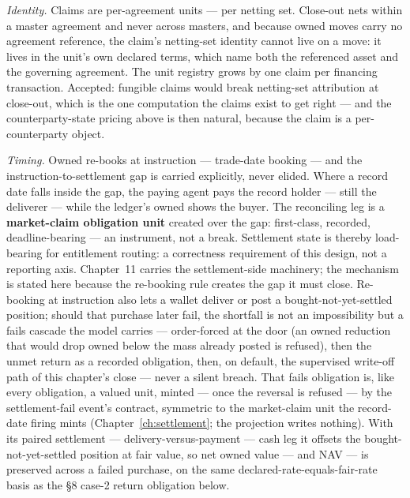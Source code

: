 \emph{Identity.} Claims are per-agreement units --- per netting set. Close-out
nets within a master agreement and never across masters, and because owned
moves carry no agreement reference, the claim's netting-set identity cannot
live on a move: it lives in the unit's own declared terms, which name both the
referenced asset and the governing agreement. The unit registry grows by one
claim per financing transaction. Accepted: fungible claims would break
netting-set attribution at close-out, which is the one computation the claims
exist to get right --- and the counterparty-state pricing above is then
natural, because the claim is a per-counterparty object.

\emph{Timing.} Owned re-books at instruction --- trade-date booking --- and
the instruction-to-settlement gap is carried explicitly, never elided. Where a
record date falls inside the gap, the paying agent pays the record holder ---
still the deliverer --- while the ledger's owned shows the buyer. The
reconciling leg is a \textbf{market-claim obligation unit} created over the
gap: first-class, recorded, deadline-bearing --- an instrument, not a break.
Settlement state is thereby load-bearing for entitlement routing: a
correctness requirement of this design, not a reporting axis. Chapter~11
carries the settlement-side machinery; the mechanism is stated here because
the re-booking rule creates the gap it must close. Re-booking at instruction
also lets a wallet deliver or post a bought-not-yet-settled position; should
that purchase later fail, the shortfall is not an impossibility but a fails
cascade the model carries --- order-forced at the door (an owned reduction that
would drop owned below the mass already posted is refused), then the unmet
return as a recorded obligation, then, on default, the supervised write-off path
of this chapter's close --- never a silent breach. That fails obligation is, like
every obligation, a valued unit, minted --- once the reversal is refused --- by the
settlement-fail event's contract, symmetric to the market-claim unit the record-date
firing mints (Chapter~\ref{ch:settlement}; the projection writes nothing). With its
paired settlement --- delivery-versus-payment --- cash leg it offsets the
bought-not-yet-settled position at fair value, so net owned value --- and NAV --- is
preserved across a failed purchase, on the same declared-rate-equals-fair-rate basis as
the \S8 case-2 return obligation below.

